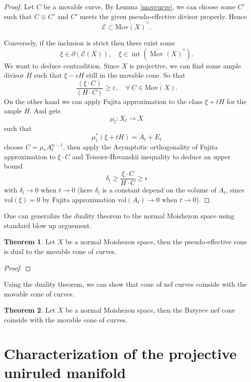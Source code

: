 \documentclass[11pt]{article}
\theoremstyle{definition}
\newtheorem{theorem}{Theorem}
\begin{document}
	\begin{proof}
		Let $C$ be a movable curve, By Lemma \ref{movcurve}, we can choose some $C'$ such that $C \equiv C'$ and $C'$ meets the given pseudo-effective divisor properly. Hence $$\mathcal{E} \subset \overline{\text{Mov}(X)}^\vee.$$
		
		Conversely, if the inclusion is strict then there exist some  $$\xi \in \partial(\mathcal{E}(X)), \quad \xi \in \operatorname{int}\left(\overline{\operatorname{Mov}}(X)^*\right) .$$We want to deduce contradition. Since $X$ is projective, we can find some ample divisor $H$ such that $\xi - \epsilon H$ still in the movable cone. So that $$
		\frac{(\xi \cdot C)}{(H \cdot C)} \geq \varepsilon
		, \quad \forall \ C \in \overline{\text{Mov}(X)}.$$
		On the other hand we can apply Fujita approximation to the class $\xi+ t H$ for the ample $H$. And gets $$\mu_t :X_t \to X$$such that $$\mu_t^* (\xi + t H) = A_t + E_t$$choose $C  = \mu_*  A_t^{n-1}$, then apply the Asymptotic orthogonality of Fujita approximation to $\xi \cdot C$ and Teissier-Hovanskii inequality to deduce an upper bound $$\delta_t \ge \frac{\xi \cdot C}{ H \cdot C} \ge \epsilon$$with $\delta_t \to 0$ when $t\to 0$ (here $\delta_t$ is a constant depend on the volume of $A_t$, since $\text{vol}(\xi) = 0$ by Fujita approximation $\text{vol}(A_t) \to 0$ when $t\to 0$).
		
	\end{proof}
	One can generalize the duality theorem to the normal Moishezon space using standard blow up arguement.
	\begin{theorem}
		Let $X$ be a normal Moishezon space, then the pseudo-effective cone is dual to the movable cone of curves.
	\end{theorem}
	\begin{proof}
		
	\end{proof}
	
	Using the duality theorem, we can show that cone of nef curves coinside with the movable cone of curves.
	\begin{theorem}
		Let $X$ be a normal Moishezon space, then the Batyrev nef cone coinside with the movable cone of curves.
	\end{theorem}
	
	\section{Characterization of the projective uniruled manifold}
	
\end{document}
